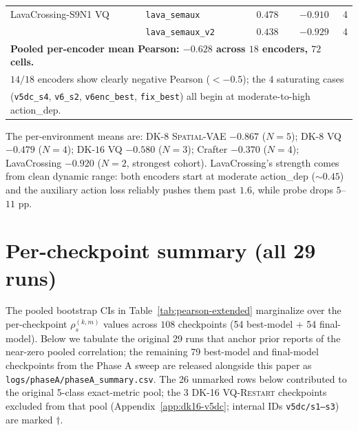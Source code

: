 \documentclass{article}
\newcommand{\encVQRestart}{\textsc{VQ-Restart}}
\newcommand{\encSpatialVAE}{\textsc{Spatial-VAE}}
\begin{document}
\begin{table}[h]
\begin{tabular}{l l r r r}
    \midrule
    LavaCrossing-S9N1 VQ & \texttt{lava\_semaux}     & $0.478$ & $\mathbf{-0.910}$ & 4 \\
    & \texttt{lava\_semaux\_v2} & $0.438$ & $\mathbf{-0.929}$ & 4 \\
    \midrule
    \multicolumn{5}{l}{\textbf{Pooled per-encoder mean Pearson: $-0.628$ across $18$ encoders, $72$ cells.}}\\
    \multicolumn{5}{l}{$14/18$ encoders show clearly negative Pearson ($<-0.5$); the $4$ saturating cases}\\
    \multicolumn{5}{l}{(\texttt{v5dc\_s4}, \texttt{v6\_s2}, \texttt{v6enc\_best}, \texttt{fix\_best}) all begin at moderate-to-high action\_dep.}\\
    \bottomrule
  \end{tabular}
\end{table}

The per-environment means are: DK-$8$ \encSpatialVAE{} $-0.867$ ($N{=}5$); DK-$8$ VQ $-0.479$ ($N{=}4$); DK-$16$ VQ $-0.580$ ($N{=}3$); Crafter $-0.370$ ($N{=}4$); LavaCrossing $-0.920$ ($N{=}2$, strongest cohort). LavaCrossing's strength comes from clean dynamic range: both encoders start at moderate action\_dep ($\sim 0.45$) and the auxiliary action loss reliably pushes them past $1.6$, while probe drops $5$--$11$ pp.

\section{Per-checkpoint summary (all 29 runs)}\label{app:per-checkpoint}

The pooled bootstrap CIs in Table~\ref{tab:pearson-extended} marginalize over the per-checkpoint $\rho_s^{(k,m)}$ values across $108$ checkpoints (54 best-model + 54 final-model). Below we tabulate the original 29 runs that anchor prior reports of the near-zero pooled correlation; the remaining 79 best-model and final-model checkpoints from the Phase A sweep are released alongside this paper as \texttt{logs/phaseA/phaseA\_summary.csv}. The 26 unmarked rows below contributed to the original 5-class exact-metric pool; the 3 DK-16 \encVQRestart{} checkpoints excluded from that pool (Appendix~\ref{app:dk16-v5dc}; internal IDs \texttt{v5dc/s1--s3}) are marked $\dagger$.
\end{document}

